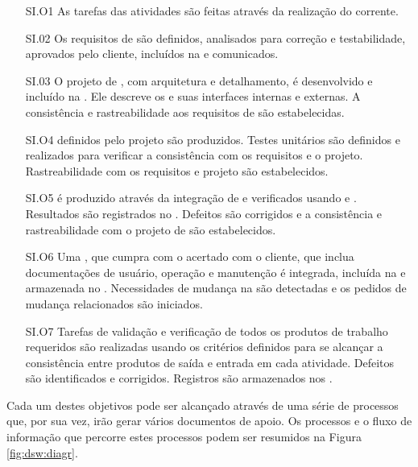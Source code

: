 \begin{itemize}

\item[SI.O1] As tarefas das atividades são feitas através da realização do \ppj corrente.

\item[SI.02] Os requisitos de \sw são definidos, analisados para correção e testabilidade, aprovados pelo cliente, incluídos na \bline e comunicados.

\item[SI.03] O projeto de \sw, com arquitetura e detalhamento, é desenvolvido e incluído na \bline. Ele descreve os \comp e suas interfaces internas e externas. A consistência e rastreabilidade aos requisitos de \sw são estabelecidas.

\item[SI.O4] \comp definidos pelo projeto são produzidos. Testes unitários são definidos e realizados para verificar a consistência com os requisitos e o projeto. Rastreabilidade com os requisitos e projeto são estabelecidos.

\item[SI.O5] \Sw é produzido através da integração de \comp e verificados usando \tcase e \tproc. Resultados são registrados no \trep. Defeitos são corrigidos e a consistência e rastreabilidade com o projeto de \sw são estabelecidos.

\item[SI.O6] Uma \swcfg, que cumpra com o \req acertado com o cliente, que inclua documentações de usuário, operação e manutenção é integrada, incluída na \bline e armazenada no \rep. Necessidades de mudança na \swcfg são detectadas e os pedidos de mudança relacionados são iniciados.

\item[SI.O7] Tarefas de validação e verificação de todos os produtos de trabalho requeridos são realizadas usando os critérios definidos para se alcançar a consistência entre produtos de saída e entrada em cada atividade. Defeitos são identificados e corrigidos. Registros são armazenados nos \vvres.

\end{itemize}

Cada um destes objetivos pode ser alcançado através de uma série de processos que, por sua vez, irão gerar vários documentos de apoio. Os processos e o fluxo de informação que percorre estes processos podem ser resumidos na Figura \ref{fig:dsw:diagr}.

